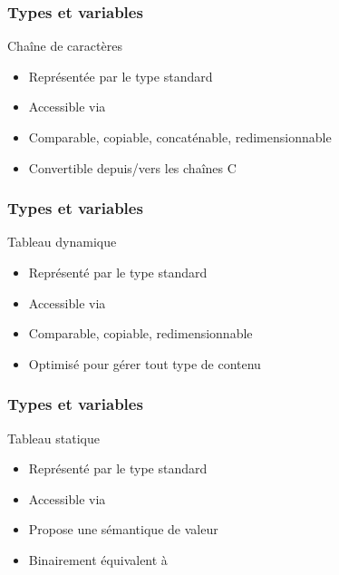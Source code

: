 \documentclass[svgnames]{beamer}
\begin{document}
\begin{frame}
  \frametitle{Types et variables}
  \begin{block}{Chaîne de caractères}
  \begin{itemize}
  \item Représentée par le type standard 
  \item Accessible via 
  \item Comparable, copiable, concaténable, redimensionnable
  \item Convertible depuis/vers les chaînes C
  \end{itemize}

  \begin{overlayarea}{\textwidth}{4cm}
  \end{overlayarea}
  \end{block}
\end{frame}

\begin{frame}
  \frametitle{Types et variables}
  \begin{block}{Tableau dynamique}
  \begin{itemize}
  \item Représenté par le type standard 
  \item Accessible via 
  \item Comparable, copiable, redimensionnable
  \item Optimisé pour gérer tout type de contenu
  \end{itemize}

  \end{block}
\end{frame}

\begin{frame}
  \frametitle{Types et variables}
  \begin{block}{Tableau statique}
  \begin{itemize}
  \item Représenté par le type standard 
  \item Accessible via 
  \item Propose une sémantique de valeur
  \item Binairement équivalent à 
  \end{itemize}

  \begin{overlayarea}{\textwidth}{4cm}
  \end{overlayarea}
  \end{block}
\end{frame}
\end{document}
